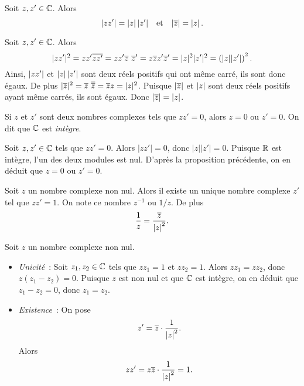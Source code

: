 \documentclass{magnolia}
\begin{document}
\begin{proposition}[utile=-3]
  Soit $z,z'\in\mathbb{C}$. Alors
  \[\left|z z'\right|=\left|z\right|\left|z'\right| \quad\!\text{et}\quad\! \left|\overline{z}\right|=\left|z\right|.\]
\end{proposition}

\begin{preuve}
Soit $z,z'\in\mathbb{C}$. Alors
\[|z z'|^2=z z'\conj{z z'}=z z'\conj{z}\ \conj{z}'=z\conj{z}z'\conj{z}'=|z|^2|z'|^2=\p{|z||z'|}^2.\]
Ainsi, $\left|z z'\right|$ et $\left|z\right|\left|z'\right|$ sont deux réels positifs qui ont même carré, ils sont donc égaux. De plus $|\conj{z}|^2=\conj{z}\ \conj{\conj{z}}=\conj{z}z=|z|^2$. Puisque $\left|\overline{z}\right|$ et $\left|z\right|$ sont deux réels positifs ayant même carrés, ils sont égaux. Donc $\left|\overline{z}\right|=\left|z\right|$.
\end{preuve}


\begin{proposition}
  Si $z$ et $z'$ sont deux nombres complexes tels que $z z'=0$, alors
  $z=0$ ou $z'=0$. On dit que $\mathbb{C}$ est \emph{intègre}.
\end{proposition}

\begin{preuve}
Soit $z,z'\in\mathbb{C}$ tels que $zz'=0$. Alors $|zz'|=0$, donc $|z||z'|=0$. Puisque $\mathbb{R}$ est intègre, l'un des deux modules est nul. D'après la proposition précédente, on en déduit que $z=0$ ou $z'=0$.

\end{preuve}
\begin{proposition}
  Soit $z$ un nombre complexe non nul. Alors il existe un unique nombre
  complexe $z'$ tel que $zz'=1$. On note ce nombre $z^{-1}$ ou $1/z$. De plus
  \[\frac{1}{z}=\frac{\overline{z}}{\left|z\right|^2}.\]
\end{proposition}

\begin{preuve}
Soit $z$ un nombre complexe non nul.
\begin{itemize}
\item \emph{Unicité}~: Soit $z_1,z_2\in\mathbb{C}$ tels que $z z_1=1$ et $z z_2=1$. Alors $z z_1=z z_2$, donc $z(z_1-z_2)=0$. Puisque $z$ est non nul et que $\mathbb{C}$ est intègre, on en déduit que $z_1-z_2=0$, donc $z_1=z_2$.
\item \emph{Existence}~: On pose
\[z'= \overline{z} \cdot \frac{1}{\left|z\right|^2}.\]
Alors
\[z z'=z\overline{z}\cdot\frac{1}{\left|z\right|^2} =1.\]
\end{itemize}
\end{preuve}
\end{document}
